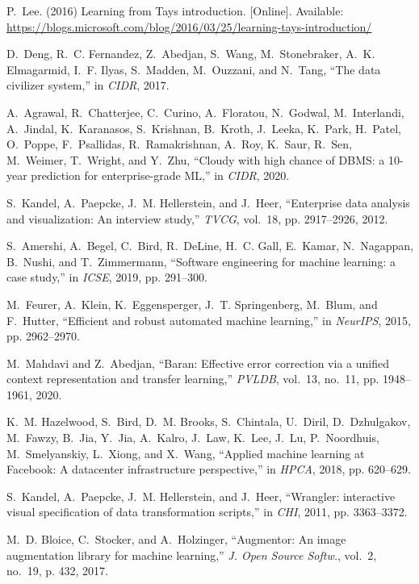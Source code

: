\documentclass[11pt,dvipsnames]{article}
\begin{document}
\begin{thebibliography}{10}
\BIBentryALTinterwordspacing
P.~Lee. (2016) Learning from {Tays} introduction. [Online]. Available:
  \url{https://blogs.microsoft.com/blog/2016/03/25/learning-tays-introduction/}
\BIBentrySTDinterwordspacing

D.~Deng, R.~C. Fernandez, Z.~Abedjan, S.~Wang, M.~Stonebraker, A.~K.
  Elmagarmid, I.~F. Ilyas, S.~Madden, M.~Ouzzani, and N.~Tang, ``The data
  civilizer system,'' in \emph{CIDR}, 2017.

A.~Agrawal, R.~Chatterjee, C.~Curino, A.~Floratou, N.~Godwal, M.~Interlandi,
  A.~Jindal, K.~Karanasos, S.~Krishnan, B.~Kroth, J.~Leeka, K.~Park, H.~Patel,
  O.~Poppe, F.~Psallidas, R.~Ramakrishnan, A.~Roy, K.~Saur, R.~Sen, M.~Weimer,
  T.~Wright, and Y.~Zhu, ``Cloudy with high chance of {DBMS:} a 10-year
  prediction for enterprise-grade {ML},'' in \emph{CIDR}, 2020.

S.~Kandel, A.~Paepcke, J.~M. Hellerstein, and J.~Heer, ``Enterprise data
  analysis and visualization: An interview study,'' \emph{TVCG}, vol.~18, pp.
  2917--2926, 2012.

S.~Amershi, A.~Begel, C.~Bird, R.~DeLine, H.~C. Gall, E.~Kamar, N.~Nagappan,
  B.~Nushi, and T.~Zimmermann, ``Software engineering for machine learning: a
  case study,'' in \emph{ICSE}, 2019, pp. 291--300.

M.~Feurer, A.~Klein, K.~Eggensperger, J.~T. Springenberg, M.~Blum, and
  F.~Hutter, ``Efficient and robust automated machine learning,'' in
  \emph{NeurIPS}, 2015, pp. 2962--2970.

M.~Mahdavi and Z.~Abedjan, ``Baran: Effective error correction via a unified
  context representation and transfer learning,'' \emph{PVLDB}, vol.~13,
  no.~11, pp. 1948--1961, 2020.

K.~M. Hazelwood, S.~Bird, D.~M. Brooks, S.~Chintala, U.~Diril, D.~Dzhulgakov,
  M.~Fawzy, B.~Jia, Y.~Jia, A.~Kalro, J.~Law, K.~Lee, J.~Lu, P.~Noordhuis,
  M.~Smelyanskiy, L.~Xiong, and X.~Wang, ``Applied machine learning at
  {F}acebook: {A} datacenter infrastructure perspective,'' in \emph{HPCA},
  2018, pp. 620--629.

S.~Kandel, A.~Paepcke, J.~M. Hellerstein, and J.~Heer, ``Wrangler: interactive
  visual specification of data transformation scripts,'' in \emph{CHI}, 2011,
  pp. 3363--3372.

M.~D. Bloice, C.~Stocker, and A.~Holzinger, ``Augmentor: An image augmentation
  library for machine learning,'' \emph{J. Open Source Softw.}, vol.~2, no.~19,
  p. 432, 2017.


\end{thebibliography}
\end{document}
